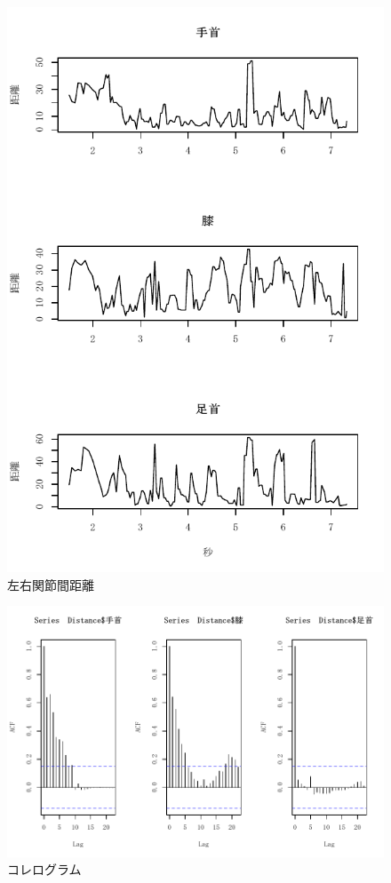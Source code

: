 \documentclass[a4j,10.5pt]{jreport}
\begin{document}
\begin{figure}
    \centering
    \includegraphics[width=\linewidth]{figs/distance.pdf}
    \caption{左右関節間距離}
    \label{fig:lengthdata}
\end{figure}
\begin{figure}
    \centering
    \includegraphics{figs/acf.pdf}
    \caption{コレログラム}
    \label{fig:acf}
\end{figure}
\end{document}
